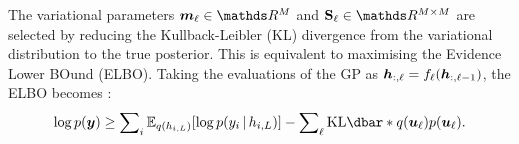 %
%
 The variational parameters $\vm_\ell \in \Reals^M$ and $\MS_\ell \in \Reals^{M \times M}$ are selected by reducing the Kullback-Leibler (KL) divergence from the variational distribution to the true posterior. This is equivalent to maximising the Evidence Lower BOund (ELBO). Taking the evaluations of the GP as $\bm{h}_{:, \ell} = f_\ell(\bm{h}_{:, \ell-1})$, the ELBO becomes \citep{salimbeni2017doubly}:
\begin{equation}
\label{eq:dgp-elbo}
\log p(\vy) \ge \sum\nolimits_i \Exp{q(h_{i, L})}{\log p(y_i \given h_{i, L})} - \sum\nolimits_{\ell} \KL{q(\vu_\ell)}{p(\vu_\ell)}.
\end{equation}

